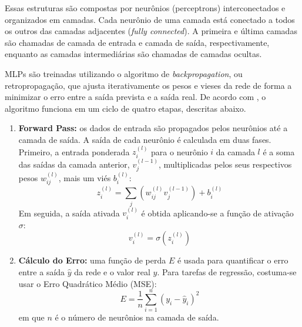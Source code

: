 Essas estruturas são compostas por neurônios (perceptrons) interconectados e organizados em camadas. Cada neurônio de uma 
camada está conectado a todos os outros das camadas adjacentes (\textit{fully connected}). A primeira e última camadas são 
chamadas de camada de entrada e camada de saída, respectivamente, enquanto as camadas intermediárias são chamadas de 
camadas ocultas.

MLPs são treinadas utilizando o algoritmo de \textit{backpropagation}, ou retropropagação, que ajusta iterativamente os 
pesos e vieses da rede de forma a minimizar o erro entre a saída prevista e a saída real. De acordo com 
, o algoritmo funciona em um ciclo de quatro etapas, descritas abaixo.

\newpage
\begin{enumerate}
\item \textbf{Forward Pass:} os dados de entrada são propagados pelos neurônios até a camada de saída. A saída de cada 
neurônio é calculada em duas fases. Primeiro, a entrada ponderada $ z_i^{(l)} $ para o neurônio $ i $ da camada
$ l $ é a soma das saídas da camada anterior, $ v_j^{(l-1)} $, multiplicadas pelos seus respectivos pesos $ w_{ij}^{(l)} $, 
mais um viés $ b_i^{(l)} $:
\begin{equation}
\label{eq:soma_ponderada_u}
z_i^{(l)} = \sum_{j} (w_{ij}^{(l)} v_j^{(l-1)}) + b_i^{(l)}
\end{equation}
Em seguida, a saída ativada $ v_i^{(l)} $ é obtida aplicando-se a função de ativação $ \sigma $:
\begin{equation}
\label{eq:ativacao_v}
v_i^{(l)} = \sigma(z_i^{(l)})
\end{equation}

\item \textbf{Cálculo do Erro:} uma função de perda $ E $ é usada para quantificar o erro entre a saída $ \hat{y} $ da 
rede e o valor real $ y $. Para tarefas de regressão, costuma-se usar o Erro Quadrático Médio (MSE):
\begin{equation}
\label{eq:mse_v}
E = \frac{1}{n} \sum_{i=1}^{n} (y_{i} - \hat{y}_i)^2
\end{equation}
em que $ n $ é o número de neurônios na camada de saída.


\end{enumerate}
